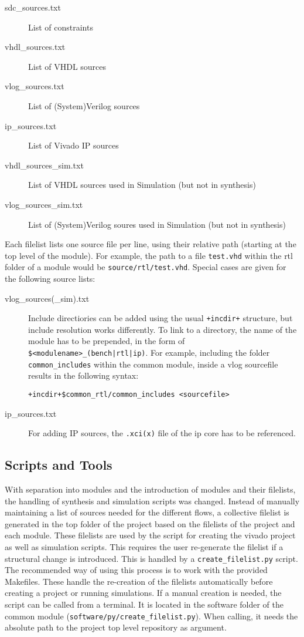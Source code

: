 \documentclass{scrartcl}
\begin{document}
\begin{description}
\item[sdc\_sources.txt] List of constraints
\item[vhdl\_sources.txt] List of VHDL sources
\item [vlog\_sources.txt] List of (System)Verilog sources
  \item[ip\_sources.txt] List of Vivado IP sources
  \item [vhdl\_sources\_sim.txt] List of VHDL sources used in Simulation
    (but not in synthesis)
\item [vlog\_sources\_sim.txt] List of (System)Verilog soures used in Simulation
  (but not in synthesis)
\end{description}

Each filelist lists one source file per line, using their relative
path (starting at the top level of the module). For example, the path
to a file \verb|test.vhd| within the rtl folder of a module would be
\verb|source/rtl/test.vhd|. Special cases are given for the following
source lists:
\begin{description}
\item[vlog\_sources(\_sim).txt] Include directiories can be added
  using the usual \verb|+incdir+| structure, but include resolution
  works differently. To link to a directory, the name of the module
  has to be prepended, in the form of
  \verb+$<modulename>_(bench|rtl|ip)+. For example, including the
  folder \verb|common_includes| within the common module, inside a
  vlog sourcefile results in the following syntax:
\begin{verbatim}
+incdir+$common_rtl/common_includes <sourcefile>
\end{verbatim}
\item [ip\_sources.txt] For adding IP sources, the \verb|.xci(x)| file of
  the ip core has to be referenced.
\end{description}

\subsection{Scripts and Tools}

With separation into modules and the introduction of modules and their
filelists, the handling of synthesis and simulation scripts was
changed. Instead of manually maintaining a list of sources needed for
the different flows, a collective filelist is generated in the top
folder of the project based on the filelists of the project and each
module. These filelists are used by the script for creating the vivado
project as well as simulation scripts. This requires the user
re-generate the filelist if a structural change is introduced. This is
handled by a \verb|create_filelist.py| script. The recommended way of
using this process is to work with the provided Makefiles. These
handle the re-creation of the filelists automatically before creating
a project or running simulations. If a manual creation is needed, the
script can be called from a terminal. It is located in the software
folder of the common module
(\verb|software/py/create_filelist.py|). When calling, it needs the
absolute path to the project top level repository as argument.
\end{document}
